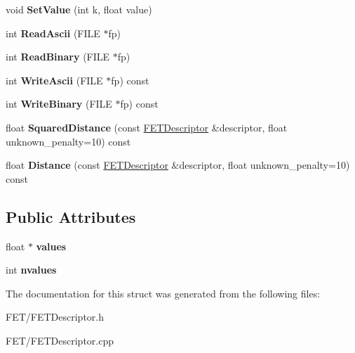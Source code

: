 \begin{DoxyCompactItemize}
\item 
void {\bfseries Set\+Value} (int k, float value)\hypertarget{struct_f_e_t_descriptor_a9059dde6f0ac7d9876fe352b407651aa}{}\label{struct_f_e_t_descriptor_a9059dde6f0ac7d9876fe352b407651aa}

\item 
int {\bfseries Read\+Ascii} (F\+I\+LE $\ast$fp)\hypertarget{struct_f_e_t_descriptor_a89c4fe3bd3e2e2f629accf406b573cd0}{}\label{struct_f_e_t_descriptor_a89c4fe3bd3e2e2f629accf406b573cd0}

\item 
int {\bfseries Read\+Binary} (F\+I\+LE $\ast$fp)\hypertarget{struct_f_e_t_descriptor_ac3a0c5df46f5a7ff1b50a6ecc75195a7}{}\label{struct_f_e_t_descriptor_ac3a0c5df46f5a7ff1b50a6ecc75195a7}

\item 
int {\bfseries Write\+Ascii} (F\+I\+LE $\ast$fp) const \hypertarget{struct_f_e_t_descriptor_aca67a0e416ed768a0ce49b6c54441d66}{}\label{struct_f_e_t_descriptor_aca67a0e416ed768a0ce49b6c54441d66}

\item 
int {\bfseries Write\+Binary} (F\+I\+LE $\ast$fp) const \hypertarget{struct_f_e_t_descriptor_aadfa80b4882e106f0d5d9039b62a7058}{}\label{struct_f_e_t_descriptor_aadfa80b4882e106f0d5d9039b62a7058}

\item 
float {\bfseries Squared\+Distance} (const \hyperlink{struct_f_e_t_descriptor}{F\+E\+T\+Descriptor} \&descriptor, float unknown\+\_\+penalty=10) const \hypertarget{struct_f_e_t_descriptor_a046f41a547aa836ffca65a617bbb4574}{}\label{struct_f_e_t_descriptor_a046f41a547aa836ffca65a617bbb4574}

\item 
float {\bfseries Distance} (const \hyperlink{struct_f_e_t_descriptor}{F\+E\+T\+Descriptor} \&descriptor, float unknown\+\_\+penalty=10) const \hypertarget{struct_f_e_t_descriptor_abfc921e92b8ab7c76e554e0de5287a26}{}\label{struct_f_e_t_descriptor_abfc921e92b8ab7c76e554e0de5287a26}

\end{DoxyCompactItemize}
\subsection*{Public Attributes}
\begin{DoxyCompactItemize}
\item 
float $\ast$ {\bfseries values}\hypertarget{struct_f_e_t_descriptor_a1abc043197993f6c6dbde7ce9a55c97c}{}\label{struct_f_e_t_descriptor_a1abc043197993f6c6dbde7ce9a55c97c}

\item 
int {\bfseries nvalues}\hypertarget{struct_f_e_t_descriptor_a9a5e2fcac8102473867227c1afe83101}{}\label{struct_f_e_t_descriptor_a9a5e2fcac8102473867227c1afe83101}

\end{DoxyCompactItemize}


The documentation for this struct was generated from the following files\+:\begin{DoxyCompactItemize}
\item 
F\+E\+T/F\+E\+T\+Descriptor.\+h\item 
F\+E\+T/F\+E\+T\+Descriptor.\+cpp\end{DoxyCompactItemize}
